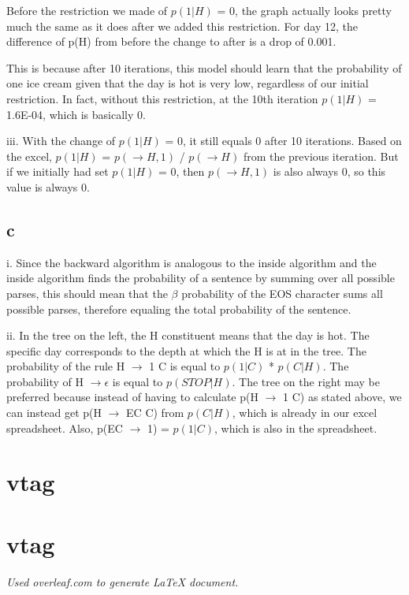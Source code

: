 \documentclass[12pt, letterpaper]{article}
\begin{document}
Before the restriction we made of $p(1 | H)$ = 0, the graph actually looks pretty much the same as it does after we added this restriction. For day 12, the difference of p(H) from before the change to after is a drop of 0.001.

This is because after 10 iterations, this model should learn that the probability of one ice cream given that the day is hot is very low, regardless of our initial restriction. In fact, without this restriction, at the 10th iteration $p(1 | H)$ = 1.6E-04, which is basically 0.

iii. With the change of $p(1|H)$ = 0, it still equals 0 after 10 iterations. Based on the excel, $p(1|H)$ = $p(\rightarrow H, 1)$ / $p(\rightarrow H)$ from the previous iteration. But if we initially had set $p(1|H)$ = 0, then $p(\rightarrow H, 1)$ is also always 0, so this value is always 0.

\subsection{c}

i. Since the backward algorithm is analogous to the inside algorithm and the inside algorithm finds the probability of a sentence by summing over all possible parses, this should mean that the $\beta$ probability of the EOS character sums all possible parses, therefore equaling the total probability of the sentence.

ii. In the tree on the left, the H constituent means that the day is hot. The specific day corresponds to the depth at which the H is at in the tree.
The probability of the rule H $\rightarrow$ 1 C is equal to $p(1 | C)$ * $p(C | H)$. 
The probability of H $\rightarrow \epsilon$ is equal to $p(STOP | H)$. 
The tree on the right may be preferred because instead of having to calculate p(H $\rightarrow$ 1 C) as stated above, we can instead get p(H $\rightarrow$ EC C) from $p(C | H)$, which is already in our excel spreadsheet. Also, p(EC $\rightarrow$ 1) = $p(1 | C)$, which is also in the spreadsheet.

\section{vtag}

\section{vtag}



\begin{center}
\textit{Used overleaf.com to generate LaTeX document.}
\end{center}
\end{document}
